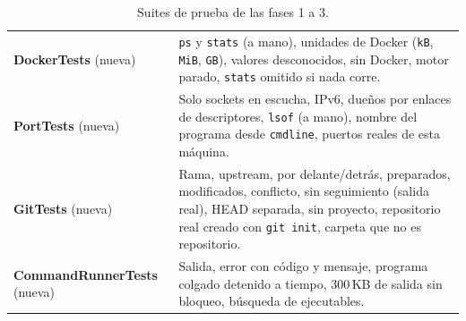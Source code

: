 \documentclass[11pt,a4paper]{article}
\begin{document}
\begin{table}[H]
\begin{tabularx}{\textwidth}{@{}lX@{}}
\textbf{DockerTests} (nueva) & \texttt{ps} y \texttt{stats} (a mano),
unidades de Docker (\texttt{kB}, \texttt{MiB}, \texttt{GB}), valores
desconocidos, sin Docker, motor parado, \texttt{stats} omitido si nada
corre.\\
\textbf{PortTests} (nueva) & Solo sockets en escucha, IPv6, dueños
por enlaces de descriptores, \texttt{lsof} (a mano), nombre del
programa desde \texttt{cmdline}, puertos reales de esta máquina.\\
\textbf{GitTests} (nueva) & Rama, upstream, por delante/detrás,
preparados, modificados, conflicto, sin seguimiento (salida real),
HEAD separada, sin proyecto, repositorio real creado con
\texttt{git init}, carpeta que no es repositorio.\\
\textbf{CommandRunnerTests} (nueva) & Salida, error con código y
mensaje, programa colgado detenido a tiempo, 300\,KB de salida sin
bloqueo, búsqueda de ejecutables.\\
\bottomrule
\end{tabularx}
\caption{Suites de prueba de las fases 1 a 3.}
\end{table}
\end{document}
